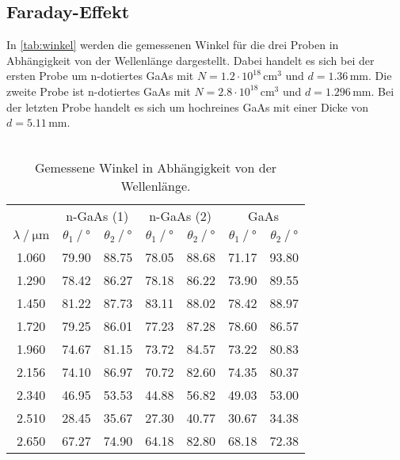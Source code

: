 \subsection{Faraday-Effekt}
In \autoref{tab:winkel} werden die gemessenen Winkel für die drei Proben in Abhängigkeit von der Wellenlänge dargestellt. Dabei handelt es sich bei der 
ersten Probe um n-dotiertes GaAs  mit $N = 1.2 \cdot 10^{18}\,\unit{\centi\meter}^3$ und $d= 1.36\,\unit{\milli\meter}$. Die zweite Probe ist 
n-dotiertes GaAs mit $N = 2.8 \cdot 10^{18}\,\unit{\centi\meter}^3$ und $d= 1.296\,\unit{\milli\meter}$. Bei der letzten Probe handelt es sich um 
hochreines GaAs mit einer Dicke von $d= 5.11\,\unit{\milli\meter}$. \\
\\
\begin{table}
    \centering
    \caption{Gemessene Winkel in Abhängigkeit von der Wellenlänge.}
    \begin{tabular}{c c c c c c c }
        \toprule
        & \multicolumn{2}{c}{n-GaAs (1)} & \multicolumn{2}{c}{n-GaAs (2)} & \multicolumn{2}{c}{GaAs} \\
		\cmidrule(lr){2-3}\cmidrule(lr){4-5}\cmidrule{6-7}
		{$\lambda \mathbin{/} \unit{\micro\meter}$} &
        {$\theta_1 \mathbin{/} \unit{\degree}$} & {$\theta_2 \mathbin{/} \unit{\degree}$} &
        {$\theta_1 \mathbin{/} \unit{\degree}$} & {$\theta_2 \mathbin{/} \unit{\degree}$} &
        {$\theta_1 \mathbin{/} \unit{\degree}$} & {$\theta_2 \mathbin{/} \unit{\degree}$} \\
		\midrule
        1.060& 79.90 & 88.75  & 78.05  &  88.68 & 71.17  &  93.80 \\
        1.290& 78.42 &  86.27 &  78.18 &  86.22 &  73.90 &  89.55 \\
        1.450& 81.22 &  87.73 &  83.11 &  88.02 &  78.42 &  88.97 \\
        1.720& 79.25 &  86.01 &  77.23 &  87.28 &  78.60 &  86.57 \\
        1.960& 74.67 &  81.15 &  73.72 &  84.57 &  73.22 &  80.83 \\
        2.156& 74.10 &  86.97 &  70.72 &  82.60 &  74.35 &  80.37 \\
        2.340& 46.95 &  53.53 &  44.88 &  56.82 &  49.03 &  53.00 \\
        2.510& 28.45 &  35.67 &  27.30 &  40.77 &  30.67 &  34.38 \\
        2.650& 67.27 &  74.90 &  64.18 &  82.80 &  68.18 &  72.38 \\
        \bottomrule
    \end{tabular}
    \label{tab:winkel}
\end{table}
